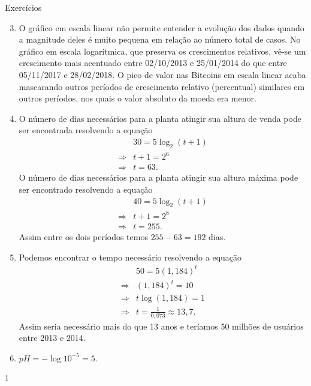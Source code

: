 \clearmargin

\begin{answer}{Exercícios}
{\exerciselist
\begin{enumerate}\setcounter{enumi}{2}
\item O gráfico em escala linear não permite entender a evolução dos dados quando a magnitude deles é muito pequena em relação ao número total de casos. No gráfico em escala logarítmica, que preserva os crescimentos relativos, vê-se um crescimento mais acentuado entre 02/10/2013 e 25/01/2014 do que entre 05/11/2017 e 28/02/2018. O pico de valor nas Bitcoins em escala linear acaba mascarando outros períodos de crescimento relativo (percentual) similares em outros períodos, nos quais o valor absoluto da moeda era menor.
\item O número de dias necessários para a planta atingir sua altura de venda pode ser encontrada resolvendo a equação
\begin{align*}
&30 = 5\log_2 (t+1)\\
\Rightarrow &t+1 = 2^6\\
\Rightarrow &t = 63.
\end{align*}
O número de dias necessários para a planta atingir sua altura máxima pode ser encontrado resolvendo a equação
\begin{align*}
&40 = 5\log_2 (t+1)\\
\Rightarrow& t+1 = 2^8\\
\Rightarrow& t = 255.
\end{align*}
Assim entre os dois períodos temos $255-63 = 192$ dias.

\item Podemos encontrar o tempo necessário resolvendo a equação
\begin{align*}
&50 = 5(1{,}184)^t\\
\Rightarrow& (1{,}184)^t = 10\\
\Rightarrow& t\log(1{,}184) = 1\\
\Rightarrow& t = \frac{1}{0{,}073} \approx 13{,}
7.
\end{align*}
Assim seria necessário mais do que 13 anos e teríamos 50 milhões de usuários entre 2013 e 2014.

\item $pH = -\log 10^{-5}=5$.
\end{enumerate}
}{1}
\end{answer}
\clearmargin
